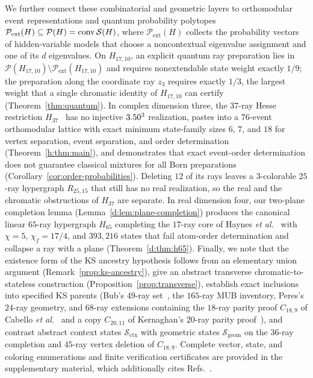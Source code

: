 \documentclass[aps,pra,reprint,superscriptaddress,longbibliography,nofootinbib,floatfix,10pt]{revtex4-2}
\theoremstyle{definition}\newtheorem{definition}[theorem]{Definition}
\theoremstyle{remark}\newtheorem{remark}[theorem]{Remark}
\begin{document}
We further connect these combinatorial and geometric layers to orthomodular event representations and quantum probability polytopes $\mathcal P_{\mathrm{ext}}(H)\subseteq\mathcal P(H)=\operatorname{conv}\mathcal S(H)$, where $\mathcal P_{\mathrm{ext}}(H)$ collects the probability vectors of hidden-variable models that choose a noncontextual eigenvalue assignment and one of its $d$ eigenvalues. On $H_{17,10}$, an explicit quantum ray preparation lies in $\mathcal P(H_{17,10})\setminus\mathcal P_{\mathrm{ext}}(H_{17,10})$ and requires nonextendable state weight exactly $1/9$; the preparation along the coordinate ray $z_3$ requires exactly $1/3$, the largest weight that a single chromatic identity of $H_{17,10}$ can certify (Theorem~\ref{thm:quantum}). In complex dimension three, the $37$-ray Hesse restriction $H_{37}$~\cite{svozil-2025-MYOCHS} has no injective $3.50^3$ realization, pastes into a $76$-event orthomodular lattice with exact minimum state-family sizes $6$, $7$, and $18$ for vertex separation, event separation, and order determination (Theorem~\ref{h:thm:main}), and demonstrates that exact event-order determination does not guarantee classical mixtures for all Born preparations (Corollary~\ref{cor:order-probabilities}). Deleting $12$ of its rays leaves a $3$-colorable $25$-ray hypergraph $R_{25,15}$ that still has no real realization, so the real and the chromatic obstructions of $H_{37}$ are separate. In real dimension four, our two-plane completion lemma (Lemma~\ref{d:lem:plane-completion}) produces the canonical linear $65$-ray hypergraph $H_{65}$ completing the $17$-ray core of Haynes \emph{et al.}~\cite{haynes2010orthogonal} with $\chi=5$, $\chi_f=17/4$, and $393{,}216$ states that fail atom-order determination and collapse a ray with a plane (Theorem~\ref{d:thm:h65}). Finally, we note that the existence form of the KS ancestry hypothesis follows from an elementary union argument (Remark~\ref{prop:ks-ancestry}), give an abstract transverse chromatic-to-stateless construction (Proposition~\ref{prop:transverse}), establish exact inclusions into specified KS parents (Bub's $49$-ray set~\cite{bub}, the $165$-ray MUB inventory, Peres's $24$-ray geometry, and $68$-ray extensions containing the $18$-ray parity proof $C_{18,9}$ of Cabello \emph{et al.}~\cite{cabello-96} and a copy $C_{20,11}$ of Kernaghan's $20$-ray parity proof~\cite{Kernaghan-1994}), and contrast abstract context states $\mathcal S_{\mathrm{ctx}}$ with geometric states $\mathcal S_{\mathrm{geom}}$ on the $36$-ray completion and $45$-ray vertex deletion of $C_{18,9}$. Complete vector, state, and coloring enumerations and finite verification certificates are provided in the supplementary material, which additionally cites Refs.~\cite{silva2019orthogonal,brinkmann2015snarks,schrag1988petersen}.
\end{document}
